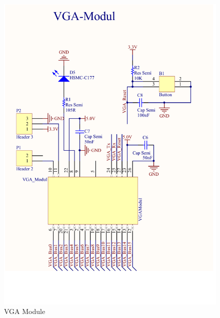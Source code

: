 \begin{figure}[h]
  \centering
  \includegraphics[width=\textwidth]{fig/pcb/schematics/pcbschematic_vgamodule.pdf}
  \caption{VGA Module}
  \label{fig:schematic-pcb-vgamodule}
\end{figure}
